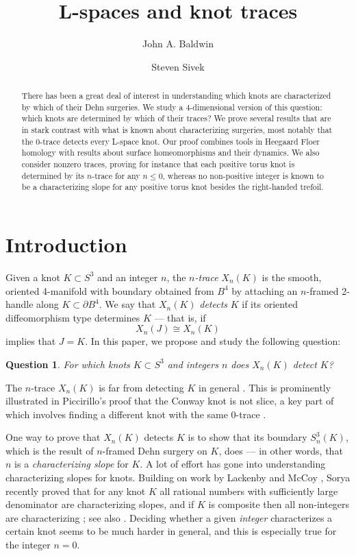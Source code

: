 \documentclass[11pt]{amsart}
\title{L-spaces and knot traces}
\author[John A. Baldwin]{John A. Baldwin}
\author[Steven Sivek]{Steven Sivek}
\newtheorem {question}[theorem]{Question}
\numberwithin{equation}{section}
\numberwithin{theorem}{section}
\theoremstyle{definition}
\begin{document}
\begin{abstract}
There has been a great deal of interest in understanding which knots are characterized by which of their Dehn surgeries. We study a 4-dimensional version of this question: which knots are determined by which of their traces? We prove several results that are in stark contrast with what is known about characterizing surgeries, most notably that the 0-trace detects every L-space knot.  Our proof combines tools in Heegaard Floer homology with results about surface homeomorphisms and their dynamics. We also consider nonzero traces, proving for instance that each positive torus knot is determined by its $n$-trace for any $n\leq 0$, whereas no non-positive integer is known to be a characterizing slope for any positive torus knot besides the right-handed trefoil. 
\end{abstract}

\maketitle

\section{Introduction}

Given a knot $K\subset S^3$ and an integer $n$, the \emph{$n$-trace} $X_n(K)$ is the smooth, oriented 4-manifold with boundary obtained from $B^4$ by attaching an $n$-framed 2-handle along $K\subset \partial B^4$. We say that $X_n(K)$ \emph{detects}  $K$ if its oriented diffeomorphism type determines $K$ --- that is, if \[X_n(J)\cong X_n(K) \] implies that $J=K$. In this paper, we propose and study the following question:

\begin{question}
\label{ques:traces}
For which knots $K\subset S^3$ and  integers $n$ does $X_n(K)$ detect $K$?
\end{question}

The $n$-trace  $X_n(K)$ is far from detecting $K$ in general \cite{akbulut-traces,lickorish-shake,AJOT}. This is prominently illustrated in Piccirillo's proof that the Conway knot is not slice, a key part of which involves finding a different knot with the same $0$-trace  \cite{piccirillo-conway}.

One way to prove that $X_n(K)$ detects $K$ is to show that its boundary $S^3_n(K)$, which is the result of $n$-framed Dehn surgery on $K$, does --- in other words, that $n$ is a \emph{characterizing slope} for $K$. A lot of effort has gone into  understanding  characterizing slopes for knots. Building on work by Lackenby  \cite{lackenby-characterizing} and McCoy \cite{mccoy-torus}, Sorya recently proved that for any knot $K$ all rational numbers with sufficiently large denominator are characterizing slopes, and if $K$ is composite then all non-integers are characterizing \cite{sorya}; see also \cite{sorya-wakelin}.  Deciding whether a given \emph{integer} characterizes a certain knot seems to be much harder in general, and this is especially true for the integer $n=0$. 
\end{document}
